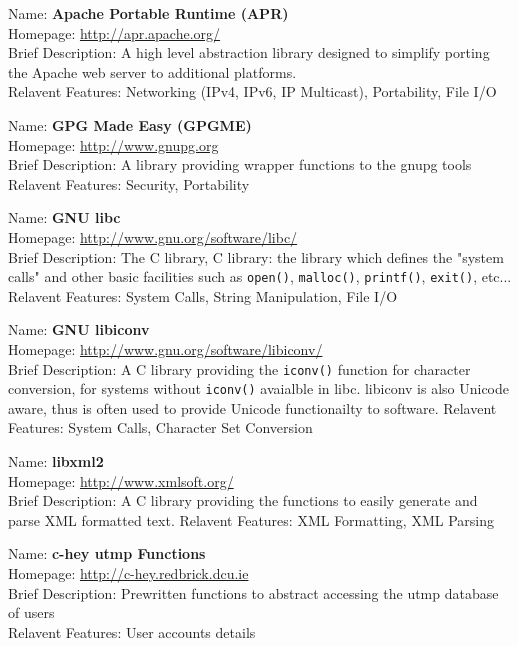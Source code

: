 
Name: 	\textbf{Apache Portable Runtime (APR)} \\
Homepage: 	\url{http://apr.apache.org/}	\\	
Brief Description: 	A high level abstraction library designed to 
simplify porting the Apache web server to additional platforms. \\
Relavent Features: Networking (IPv4, IPv6, IP Multicast), Portability, 
File I/O


Name:		\textbf{GPG Made Easy (GPGME)}	\\
Homepage:		\url{http://www.gnupg.org}	\\
Brief Description: A library providing wrapper functions to the gnupg tools
Relavent Features: Security, Portability


Name:		\textbf{GNU libc}	\\	
Homepage:		\url{http://www.gnu.org/software/libc/}	\\
Brief Description: The C library, C library: the library which
defines the "system calls" and other basic facilities such as 
\verb+open()+, \verb+malloc()+, \verb+printf()+, \verb+exit()+, etc...
Relavent Features: System Calls, String Manipulation, File I/O


Name:		\textbf{GNU libiconv}	\\	
Homepage:		\url{http://www.gnu.org/software/libiconv/}	\\
Brief Description: A C library providing the \verb+iconv()+ function for
character conversion, for systems without \verb+iconv()+ avaialble in
libc. libiconv is also Unicode aware, thus is often used to provide
Unicode functionailty to software.
Relavent Features: System Calls, Character Set Conversion


Name:		\textbf{libxml2}	\\	
Homepage:		\url{http://www.xmlsoft.org/}	\\
Brief Description: A C library providing the functions to easily
generate and parse XML formatted text.
Relavent Features: XML Formatting, XML Parsing


Name:		\textbf{c-hey utmp Functions}	\\	
Homepage:		\url{http://c-hey.redbrick.dcu.ie}	\\
Brief Description: Prewritten functions to abstract accessing the utmp
database of users \\
Relavent Features: User accounts details

